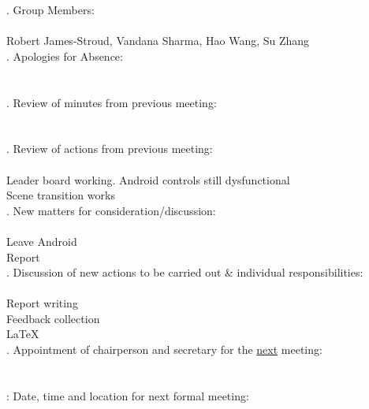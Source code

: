 \documentclass{article}
\begin{document}
. Group Members: \\\\ \indent Robert James-Stroud, Vandana Sharma, Hao Wang, Su Zhang \\

. Apologies for Absence: \\\\ \indent   \\

. Review of minutes from previous meeting: \\\\ \indent  \\

. Review of actions from previous meeting: \\\\ \indent Leader board working. Android controls still dysfunctional\\ \indent Scene transition works \\ 

. New matters for consideration/discussion: \\\\ \indent Leave Android \\\indent  Report  \\

. Discussion of new actions to be carried out \& individual responsibilities: \\\\ \indent Report writing \\ \indent Feedback collection \\ \indent \LaTeX \\ 

. Appointment of chairperson and secretary for the \underline{next} meeting: \\\\ \indent  \\

: Date, time and location for next formal meeting: \\\\ \indent  \\
\end{document}
